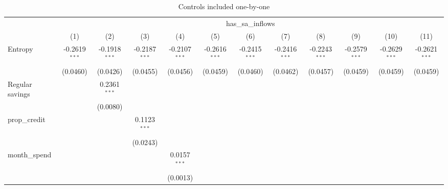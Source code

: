 
\begin{table}[htbp]
   \centering
   \caption{\label{tab:reg_sw0} Controls included one-by-one}
   \begin{tiny}
      \begin{tabular}{lccccccccccc}
         \toprule
          & \multicolumn{11}{c}{has\_sa\_inflows}\\
                                 & (1)             & (2)             & (3)             & (4)             & (5)             & (6)             & (7)             & (8)             & (9)             & (10)            & (11)\\
         \midrule 
         Entropy                 & -0.2619$^{***}$ & -0.1918$^{***}$ & -0.2187$^{***}$ & -0.2107$^{***}$ & -0.2616$^{***}$ & -0.2415$^{***}$ & -0.2416$^{***}$ & -0.2243$^{***}$ & -0.2579$^{***}$ & -0.2629$^{***}$ & -0.2621$^{***}$\\
                                 & (0.0460)        & (0.0426)        & (0.0455)        & (0.0456)        & (0.0459)        & (0.0460)        & (0.0462)        & (0.0457)        & (0.0459)        & (0.0459)        & (0.0459)\\
         Regular savings         &                 & 0.2361$^{***}$  &                 &                 &                 &                 &                 &                 &                 &                 &   \\
                                 &                 & (0.0080)        &                 &                 &                 &                 &                 &                 &                 &                 &   \\
         prop\_credit           &                 &                 & 0.1123$^{***}$  &                 &                 &                 &                 &                 &                 &                 &   \\
                                 &                 &                 & (0.0243)        &                 &                 &                 &                 &                 &                 &                 &   \\
         month\_spend           &                 &                 &                 & 0.0157$^{***}$  &                 &                 &                 &                 &                 &                 &   \\
                                 &                 &                 &                 & (0.0013)        &                 &                 &                 &                 &                 &                 &   \\

\end{tabular}
\end{tiny}
\end{table}
